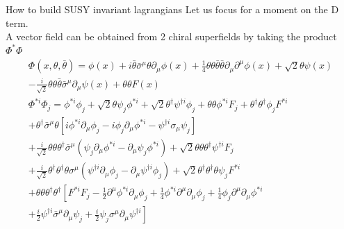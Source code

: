 \documentclass[10pt]{beamer}
\begin{document}
\begin{frame}{How to build SUSY invariant lagrangians}
    Let us focus for a moment on the D term.\\
    A vector field can be obtained from 2 chiral superfields by taking the product $\Phi^*\Phi$
    \begin{gather*}
        \Phi(x, \theta, \bar\theta) = \phi(x) + i\bar\theta \bar\sigma^{\mu}\theta \partial_{\mu}\phi(x) + \frac{1}{4}\theta\theta\bar\theta\bar\theta\partial_{\mu}\partial^{\mu}\phi(x) + \sqrt{2}\theta\psi(x)\\ 
        -\frac{i}{\sqrt{2}}\theta\theta\bar\theta\bar\sigma^{\mu}\partial_{\mu}\psi(x) + \theta\theta F(x) \\
            \Phi^{* i} \Phi_{j}= \phi^{* i} \phi_{j}+\sqrt{2} \theta \psi_{j} \phi^{* i}+\sqrt{2} \theta^{\dagger} \psi^{\dagger i} \phi_{j}+\theta \theta \phi^{* i} F_{j}+\theta^{\dagger} \theta^{\dagger} \phi_{j} F^{* i} \\
            +\theta^{\dagger} \bar{\sigma}^{\mu} \theta\left[i \phi^{* i} \partial_{\mu} \phi_{j}-i \phi_{j} \partial_{\mu} \phi^{* i}-\psi^{\dagger i} \sigma_{\mu} \psi_{j}\right] \\
                +\frac{i}{\sqrt{2}} \theta \theta \theta^{\dagger} \bar{\sigma}^{\mu}\left(\psi_{j} \partial_{\mu} \phi^{* i}-\partial_{\mu} \psi_{j} \phi^{* i}\right)+\sqrt{2} \theta \theta \theta^{\dagger} \psi^{\dagger i} F_{j} \\
                +\frac{i}{\sqrt{2}} \theta^{\dagger} \theta^{\dagger} \theta \sigma^{\mu}\left(\psi^{\dagger i} \partial_{\mu} \phi_{j}-\partial_{\mu} \psi^{\dagger i} \phi_{j}\right)+\sqrt{2} \theta^{\dagger} \theta^{\dagger} \theta \psi_{j} F^{* i} \\
                +\theta \theta \theta^{\dagger} \theta^{\dagger}\left[F^{* i} F_{j}-\frac{1}{2} \partial^{\mu} \phi^{* i} \partial_{\mu} \phi_{j}+\frac{1}{4} \phi^{* i} \partial^{\mu} \partial_{\mu} \phi_{j}+\frac{1}{4} \phi_{j} \partial^{\mu} \partial_{\mu} \phi^{* i}\right. \\
                \left.+\frac{i}{2} \psi^{\dagger i} \bar{\sigma}^{\mu} \partial_{\mu} \psi_{j}+\frac{i}{2} \psi_{j} \sigma^{\mu} \partial_{\mu} \psi^{\dagger i}\right]
    \end{gather*}
\end{frame}
\end{document}
